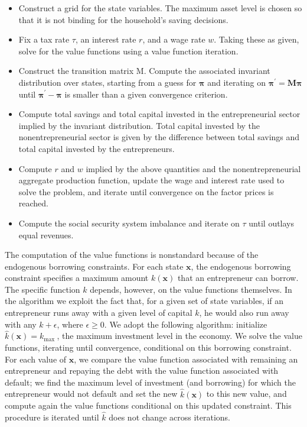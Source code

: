 \documentclass[10pt]{article}
\begin{document}
\begin{itemize}
  \item Construct a grid for the state variables. The maximum asset level is chosen so that it is not binding for the household's saving decisions.
  \item Fix a tax rate $\tau$, an interest rate $r$, and a wage rate $w$. Taking these as given, solve for the value functions using a value function iteration.
  \item Construct the transition matrix M. Compute the associated invariant distribution over states, starting from a guess for $\boldsymbol{\pi}$ and iterating on $\boldsymbol{\pi}^{\prime}= \mathbf{M} \boldsymbol{\pi}$ until $\boldsymbol{\pi}^{\prime}-\boldsymbol{\pi}$ is smaller than a given convergence criterion.
  \item Compute total savings and total capital invested in the entrepreneurial sector implied by the invariant distribution. Total capital invested by the nonentrepreneurial sector is given by the difference between total savings and total capital invested by the entrepreneurs.
  \item Compute $r$ and $w$ implied by the above quantities and the nonentrepreneurial aggregate production function, update the wage and interest rate used to solve the problem, and iterate until convergence on the factor prices is reached.
  \item Compute the social security system imbalance and iterate on $\tau$ until outlays equal revenues.
\end{itemize}

The computation of the value functions is nonstandard because of the endogenous borrowing constraints. For each state $\boldsymbol{x}$, the endogenous borrowing constraint specifies a maximum amount $k(\boldsymbol{x})$ that an entrepreneur can borrow. The specific function $k$ depends, however, on the value functions themselves. In the algorithm we exploit the fact that, for a given set of state variables, if an entrepreneur runs away with a given level of capital $k$, he would also run away with any $k+\epsilon$, where $\epsilon \geq 0$. We adopt the following algorithm: initialize $\hat{k}(\boldsymbol{x})=k_{\text {max }}$, the maximum investment level in the economy. We solve the value functions, iterating until convergence, conditional on this borrowing constraint. For each value of $\boldsymbol{x}$, we compare the value function associated with remaining an entrepreneur and repaying the debt with the value function associated with default; we find the maximum level of investment (and borrowing) for which the entrepreneur would not default and set the new $\hat{k}(\boldsymbol{x})$ to this new value, and compute again the value functions conditional on this updated constraint. This procedure is iterated until $\hat{k}$ does not change across iterations.
\end{document}
